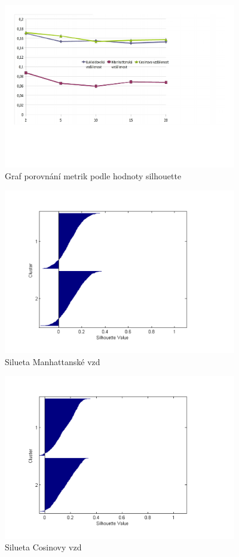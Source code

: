 \documentclass[journal]{IEEEtran}
\begin{document}
\begin{figure}[!h]
\begin{center}
\includegraphics[width=4in]{porovnani_vzd.pdf}
\caption{Graf porovn\'{a}n\'{i} metrik podle hodnoty silhouette}
\end{center}\label{f-ac}
\end{figure}

\begin{figure}[!h]
\begin{center}
\includegraphics[width=4in]{manhattan.pdf}
\caption{Silueta Manhattansk\'{e} vzd }
\end{center}\label{f-ac}
\end{figure}

\begin{figure}[!h]
\begin{center}
\includegraphics[width=4in]{cos.pdf}
\caption{Silueta Cosinovy vzd }
\end{center}\label{f-ac}
\end{figure}
\end{document}

